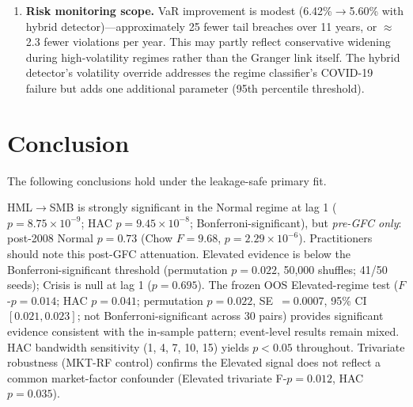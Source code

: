 \documentclass[sigconf,anonymous]{acmart}
\begin{document}
\begin{enumerate}
    \item \textbf{Risk monitoring scope.} VaR improvement is modest
    (6.42\%$\to$5.60\% with hybrid detector)---approximately 25 fewer tail breaches
    over 11 years, or $\approx$2.3 fewer violations per year. This may partly reflect
    conservative widening during high-volatility regimes rather than
    the Granger link itself. The hybrid detector's volatility override
    addresses the regime classifier's COVID-19 failure but adds one
    additional parameter (95th percentile threshold).
\end{enumerate}

\section{Conclusion}

The following conclusions hold under the leakage-safe primary fit.

HML$\to$SMB is strongly significant in the Normal regime at lag 1
($p = 8.75 \times 10^{-9}$; HAC $p = 9.45 \times 10^{-8}$; Bonferroni-significant),
but \emph{pre-GFC only}: post-2008 Normal $p = 0.73$ (Chow $F = 9.68$, $p = 2.29\times10^{-6}$).
Practitioners should note this post-GFC attenuation.
Elevated evidence is below the Bonferroni-significant threshold
(permutation $p = 0.022$, 50{,}000 shuffles; 41/50 seeds);
Crisis is null at lag 1 ($p = 0.695$).
The frozen OOS Elevated-regime test ($F$-$p = 0.014$; HAC $p = 0.041$;
permutation $p = 0.022$, SE~$= 0.0007$, 95\% CI $[0.021, 0.023]$;
not Bonferroni-significant across 30 pairs) provides significant evidence
consistent with the in-sample pattern; event-level results remain mixed.
HAC bandwidth sensitivity (1, 4, 7, 10, 15) yields $p < 0.05$ throughout.
Trivariate robustness (MKT-RF control) confirms the Elevated signal does not reflect
a common market-factor confounder (Elevated trivariate F-$p = 0.012$, HAC $p = 0.035$).
\end{document}
